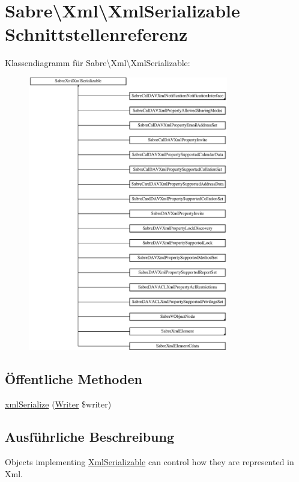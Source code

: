 \hypertarget{interface_sabre_1_1_xml_1_1_xml_serializable}{}\section{Sabre\textbackslash{}Xml\textbackslash{}Xml\+Serializable Schnittstellenreferenz}
\label{interface_sabre_1_1_xml_1_1_xml_serializable}
Klassendiagramm für Sabre\textbackslash{}Xml\textbackslash{}Xml\+Serializable\+:\begin{figure}[H]
\begin{center}
\leavevmode
\includegraphics[height=12.000000cm]{interface_sabre_1_1_xml_1_1_xml_serializable}
\end{center}
\end{figure}
\subsection*{Öffentliche Methoden}
\begin{DoxyCompactItemize}
\item 
\mbox{\hyperlink{interface_sabre_1_1_xml_1_1_xml_serializable_aa78f3ee43aa699be8347181653a53d8c}{xml\+Serialize}} (\mbox{\hyperlink{class_sabre_1_1_xml_1_1_writer}{Writer}} \$writer)
\end{DoxyCompactItemize}


\subsection{Ausführliche Beschreibung}
Objects implementing \mbox{\hyperlink{interface_sabre_1_1_xml_1_1_xml_serializable}{Xml\+Serializable}} can control how they are represented in Xml.

